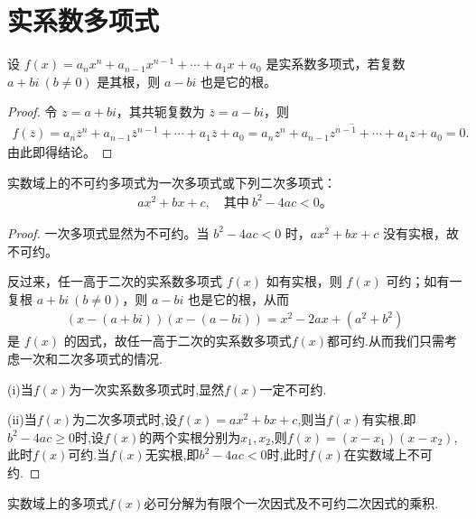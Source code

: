\documentclass[../../main.tex]{subfiles}%
\begin{document}
\section{实系数多项式}

\begin{theorem}[实系数多项式的复根成对出现]\label{theorem:实系数多项式的复根成对出现}
设 $f(x) = a_n x^n + a_{n-1} x^{n-1} + \cdots + a_1 x + a_0$ 是实系数多项式，若复数 $a + bi \ (b \neq 0)$ 是其根，则 $a - bi$ 也是它的根。
\end{theorem}
\begin{proof}

令 $z = a + bi$，其共轭复数为 $\overline{z} = a - bi$，则
\begin{align*}
f(\overline{z})=a_n\overline{z}^n+a_{n-1}\overline{z}^{n-1}+\cdots +a_1\overline{z}+a_0=\overline{a_nz^n+a_{n-1}z^{n-1}+\cdots +a_1z+a_0}=0.
\end{align*}
由此即得结论。

\end{proof}

\begin{corollary}
实数域上的不可约多项式为一次多项式或下列二次多项式：
\begin{align*}
ax^2 + bx + c, \quad \text{其中} \ b^2 - 4ac < 0。
\end{align*}
\end{corollary}
\begin{proof}

一次多项式显然为不可约。当 $b^2 - 4ac < 0$ 时，$ax^2 + bx + c$ 没有实根，故不可约。

反过来，任一高于二次的实系数多项式 $f(x)$ 如有实根，则 $f(x)$ 可约；如有一复根 $a + bi \ (b \neq 0)$，则 $a - bi$ 也是它的根，从而
\begin{align*}
(x - (a + bi))(x - (a - bi)) = x^2 - 2ax + (a^2 + b^2)
\end{align*}
是 $f(x)$ 的因式，故任一高于二次的实系数多项式$f(x)$都可约.从而我们只需考虑一次和二次多项式的情况.

(i)当$f(x)$为一次实系数多项式时,显然$f(x)$一定不可约.

(ii)当$f(x)$为二次多项式时,设$f(x)=ax^2+bx+c$,则当$f(x)$有实根,即$b^2-4ac\geqslant  0$时,设$f(x)$的两个实根分别为$x_1,x_2$,则$f(x)=(x-x_1)(x-x_2)$,此时$f(x)$可约.当$f(x)$无实根,即$b^2-4ac<0$时,此时$f(x)$在实数域上不可约.

\end{proof}

\begin{corollary}
实数域上的多项式$f(x)$必可分解为有限个一次因式及不可约二次因式的乘积.
\end{corollary}
\end{document}
